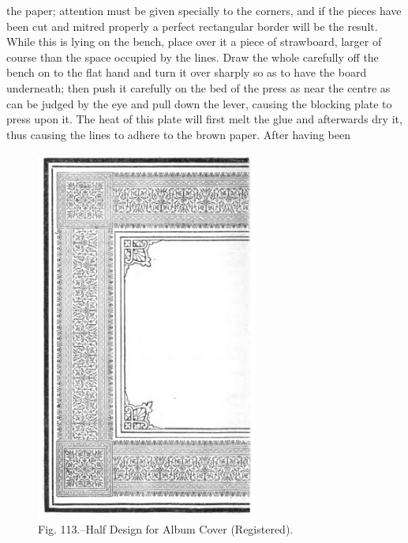 \documentclass[twoside]{book}
\begin{document}
the paper; attention must be given specially to the
corners, and if the pieces have been cut and mitred
properly a perfect rectangular border will be the
result. While this is lying on the bench, place over
it a piece of strawboard, larger of course than the
space occupied by the lines. Draw the whole carefully
off the bench on to the flat hand and turn it
over sharply so as to have the board underneath;
then push it carefully on the bed of the press as near
the centre as can be judged by the eye and pull down
the lever, causing the blocking plate to press upon
it. The heat of this plate will first melt the glue
and afterwards dry it, thus causing the lines to
adhere to the brown paper. After having been
\pagebreak
	\vspace*{\fill}
	\begin{figure}[h]
		\centering
		\includegraphics[width=0.65\textwidth]{Figures/_113.png}
		\caption*{Fig. 113.--Half Design for Album Cover (Registered).}
	\end{figure}
	\vspace*{\fill}
\pagebreak
	\vspace*{\fill}
\end{document}
